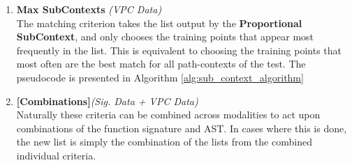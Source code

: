\begin{enumerate}
    \item\textbf{Max SubContexts} \textit{(VPC Data)}\\The matching criterion takes the list output by the \textbf{Proportional SubContext}, and only chooses the training points that appear most frequently in the list. This is equivalent to choosing the training points that most often are the best match for all path-contexts of the test. The pseudocode is presented in Algorithm \ref{alg:sub_context_algorithm} 
    \item\textbf{[Combinations]}\textit{(Sig. Data + VPC Data)} \\ Naturally these criteria can be combined across modalities to act upon combinations of the function signature and AST. In cases where this is done, the new list is simply the combination of the lists from the combined individual criteria. 
\end{enumerate}









\begin{table}[h!]

    \caption{An Summary of the BestMatchingSet algorithms we use in the experiments. For sake of simplicity, a \textit{best-effort} match here refers to the match with longest matching subsequence, when treating a VPC as one long sequence}
    \label{tab:matching_summary}
\end{table}





